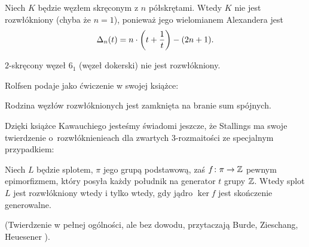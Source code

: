 \begin{example}
%
    Niech $K$ będzie węzłem skręconym z $n$ półskrętami.
    Wtedy $K$ nie jest rozwłókniony (chyba że $n = 1$), ponieważ jego wielomianem Alexandera jest
%
    \begin{equation}
        \Delta_n(t) = n \cdot \left(t + \frac 1 t \right) - (2n+1).
    \end{equation}
\end{example}

\begin{corollary}
    $2$-skręcony węzeł $6_1$ (węzeł dokerski) nie jest rozwłókniony.
\end{corollary}

Rolfsen \cite[s. 326]{rolfsen1976} podaje jako ćwiczenie w swojej książce:

\begin{proposition}
%
    Rodzina węzłów rozwłóknionych jest zamknięta na branie sum spójnych.
\end{proposition}

Dzięki książce Kawauchiego \cite[s. 84]{kawauchi1996} jesteśmy świadomi jeszcze, że Stallings ma swoje twierdzenie o~rozwłóknienieach dla zwartych 3-rozmaitości ze specjalnym przypadkiem:
%
\begin{proposition}
    Niech $L$ będzie splotem, $\pi$ jego grupą podstawową, zaś $f \colon \pi \to \mathbb Z$ pewnym epimorfizmem, który posyła każdy południk na generator $t$ grupy $\mathbb Z$. %
    Wtedy splot $L$ jest rozwłókniony wtedy i tylko wtedy, gdy jądro $\ker f$ jest skończenie generowalne.
\end{proposition}

(Twierdzenie w pełnej ogólności, ale bez dowodu, przytaczają Burde, Zieschang, Heuesener \cite[s. 75]{burde2014}).

%


